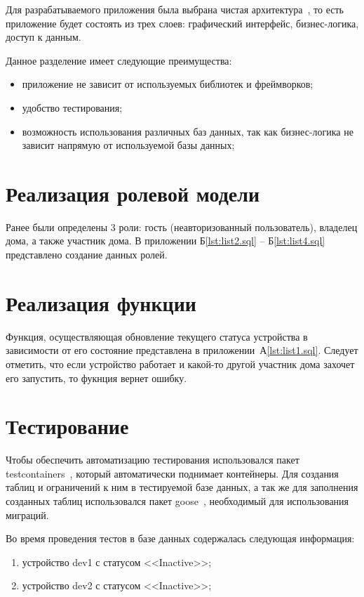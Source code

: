 Для разрабатываемого приложения была выбрана чистая архитектура~\cite{cleanArch}, то есть приложение будет 
состоять из трех слоев: графический интерфейс, бизнес-логика, доступ к данным.

Данное разделение имеет следующие преимущества:
\begin{itemize}
    \item приложение не зависит от используемых библиотек и фреймворков;
    \item удобство тестирования;
    \item возможность использования различных баз данных, так как
    бизнес-логика не зависит напрямую от используемой базы данных;
\end{itemize}

\section{Реализация ролевой модели}
Ранее были определены 3 роли: гость (неавторизованный пользователь), 
владелец дома, а также участник дома. 
В приложении Б\ref{lst:list2.sql} -- Б\ref{lst:list4.sql} представлено создание данных ролей.

\section{Реализация функции}

Функция, осуществляющая обновление текущего статуса 
устройства в зависимости от его состояние представлена 
в приложении~А\ref{lst:list1.sql}. Следует отметить, что если 
устройство работает и какой-то другой участник дома 
захочет его запустить, то фукнция вернет ошибку.  

\section{Тестирование}

Чтобы обеспечить автоматизацию тестирования
использовался пакет testcontainers~\cite{testcontainers}, который
автоматически поднимает контейнеры. Для создания таблиц 
и ограничений к ним в тестируемой базе данных, а так же
для заполнения созданных таблиц использовался пакет goose~\cite{goose}, 
необходимый для использования миграций.

Во время проведения тестов в базе данных содержалась 
следующая информация:

\begin{enumerate}
    \item устройство dev1 с статусом <<Inactive>>;
    \item устройство dev2 с статусом <<Inactive>>;
\end{enumerate}

